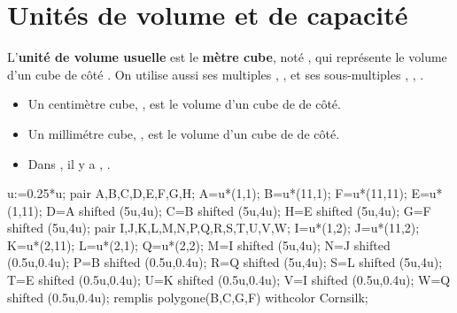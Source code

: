 \section{Unités de volume et de capacité}
\begin{definition}
    L'{\bf unité de volume usuelle} est le {\bf mètre cube}, noté \Vol[m]{}, qui représente le volume d'un cube de côté .
    On utilise aussi ses multiples \Vol[km]{}, \Vol[hm]{}, \Vol[dam]{} et ses sous-multiples \Vol[dm]{}, \Vol[cm]{}, \Vol[mm]{}.
\end{definition}

\begin{remarque}

    \begin{minipage}{0.6\linewidth}
        \begin{itemize}
            \item Un centimètre cube, , est le volume d'un cube de  de côté.
            \item Un millimétre cube, , est le volume d'un cube de  de côté.\medskip
            \item Dans , il y a , .
        \end{itemize}
    \end{minipage}
    \begin{minipage}{0.4\linewidth}
        \begin{center}
            \begin{Geometrie}[CoinBG={(-0.5u,-0.5u)}]
                u:=0.25*u;
                pair A,B,C,D,E,F,G,H;
                A=u*(1,1);
                B=u*(11,1);
                F=u*(11,11);
                E=u*(1,11);
                D=A shifted (5u,4u);
                C=B shifted (5u,4u);
                H=E shifted (5u,4u);
                G=F shifted (5u,4u);
                pair I,J,K,L,M,N,P,Q,R,S,T,U,V,W;
                I=u*(1,2);
                J=u*(11,2);
                K=u*(2,11);
                L=u*(2,1);
                Q=u*(2,2);
                M=I shifted (5u,4u);
                N=J shifted (0.5u,0.4u);
                P=B shifted (0.5u,0.4u);
                R=Q shifted (5u,4u);
                S=L shifted (5u,4u);
                T=E shifted (0.5u,0.4u);
                U=K shifted (0.5u,0.4u);
                V=I shifted (0.5u,0.4u);
                W=Q shifted (0.5u,0.4u);
                remplis polygone(B,C,G,F) withcolor Cornsilk;

\end{Geometrie}
\end{center}
\end{minipage}
\end{remarque}
